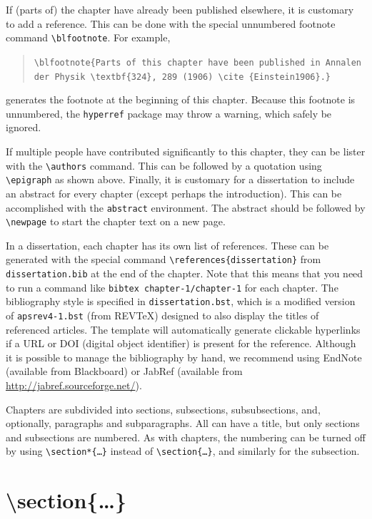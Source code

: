 If (parts of) the chapter have already been published elsewhere, it is customary to add a reference. This can be done with the special unnumbered footnote command \texttt{\textbackslash blfootnote}. For example,

\begin{quote}
\texttt{\textbackslash blfootnote\{Parts of this chapter have been published in Annalen der Physik \textbackslash textbf\{324\}, 289 (1906) \textbackslash cite \{Einstein1906\}.\}}
\end{quote}
generates the footnote at the beginning of this chapter. Because this footnote is unnumbered, the \texttt{hyperref} package may throw a warning, which safely be ignored.

If multiple people have contributed significantly to this chapter, they can be lister with the \texttt{\textbackslash authors} command. This can be followed by a quotation using \texttt{\textbackslash epigraph} as shown above. Finally, it is customary for a dissertation to include an abstract for every chapter (except perhaps the introduction). This can be accomplished with the \texttt{abstract} environment. The abstract should be followed by \texttt{\textbackslash newpage} to start the chapter text on a new page.

In a dissertation, each chapter has its own list of references. These can be generated with the special command \texttt{\textbackslash references\{dissertation\}} from \texttt{dissertation.bib} at the end of the chapter. Note that this means that you need to run a command like \texttt{bibtex chapter-1/chapter-1} for each chapter. The bibliography style is specified in \texttt{dissertation.bst}, which is a modified version of \texttt{apsrev4-1.bst} (from REVTeX) designed to also display the titles of referenced articles. The template will automatically generate clickable hyperlinks if a URL or DOI (digital object identifier) is present for the reference. Although it is possible to manage the bibliography by hand, we recommend using EndNote (available from Blackboard) or JabRef (available from \url{http://jabref.sourceforge.net/}).

Chapters are subdivided into sections, subsections, subsubsections, and, optionally, paragraphs and subparagraphs. All can have a title, but only sections and subsections are numbered. As with chapters, the numbering can be turned off by using \texttt{\textbackslash section*\{\ldots\}} instead of \texttt{\textbackslash section\{\ldots\}}, and similarly for the subsection.
\section{\textbackslash section\{\ldots\}}
